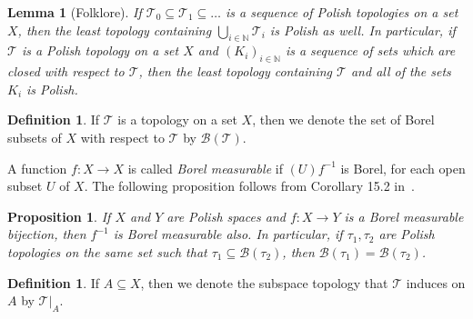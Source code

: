 \documentclass[11pt]{amsart}
\newtheorem{proposition}[theorem]{Proposition}
\newtheorem{lemma}[theorem]{Lemma}
\theoremstyle{definition}
\newtheorem{definition}[theorem]{Definition}
\newcommand{\N}{\mathbb N}
\newcommand{\Tau}{\mathcal T}
\begin{document}
\begin{lemma}[Folklore]\label{PolishBuilding}
If \(\Tau_0\subseteq \Tau_1\subseteq \ldots\) is  a sequence of Polish topologies on a set \(X\), then the least topology containing \(\bigcup_{i\in \N}\Tau_i\) is Polish as well.
In particular, if \(\Tau\) is a Polish topology on a set \(X\) and \((K_i)_{i\in \N}\) is a sequence of sets which are closed with respect to \(\Tau\), then the least topology containing \(\Tau\) and all of the sets \(K_i\) is Polish.
\end{lemma}




\begin{definition}
    If \(\mathcal{T}\) is a topology on a set \(X\), then we denote the set of Borel subsets of \(X\) with respect to \(\mathcal{T}\) by \(\mathcal{B}(\mathcal{T})\).
\end{definition}
A function $f:X\rightarrow X$ is called {\em Borel measurable} if $(U)f^{-1}$ is Borel, for each open subset $U$ of $X$.
The following proposition follows from Corollary 15.2 in~\cite{Kechris1995}.

\begin{proposition}
  \label{prop-borel-measurable}
  If $X$ and $Y$ are Polish spaces and $f: X \to Y$ is a Borel measurable
  bijection, then $f ^ {-1}$ is Borel measurable also. In particular, if $\tau_1,\tau_2$ are Polish topologies on the same set such that $ \tau_1\subseteq \mathcal B(\tau_2)$, then $ \mathcal B(\tau_1)= \mathcal B(\tau_2)$.
\end{proposition}

\begin{definition}
If \(A\subseteq X\), then we denote the subspace topology that \(\mathcal{T}\) induces on \(A\) by \(\mathcal{T}|_A\).
\end{definition}
\end{document}
